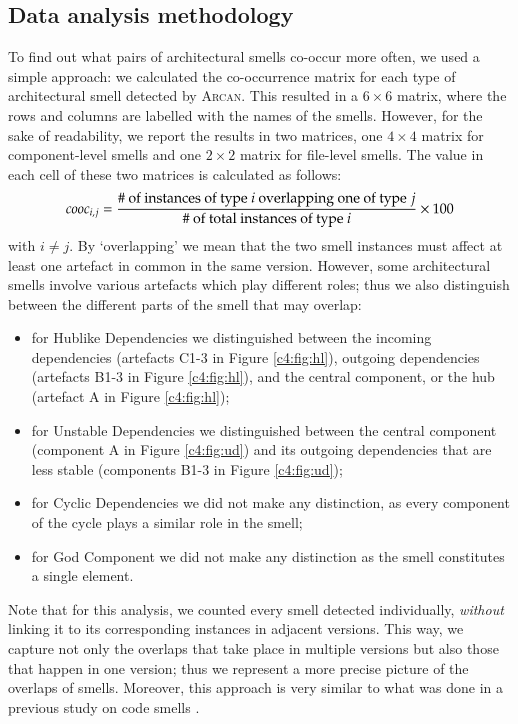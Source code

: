 \subsection{Data analysis methodology}\label{c4:sec:methodology-rq2}
To find out what pairs of architectural smells co-occur more often, we used a simple approach: we calculated the co-occurrence matrix for each type of architectural smell detected by \textsc{Arcan}. This resulted in a $6\times6$ matrix, where the rows and columns are labelled with the names of the smells. However, for the sake of readability, we report the results in two matrices, one $4\times4$ matrix for component-level smells and one $2\times2$ matrix for file-level smells. 
The value in each cell of these two matrices is calculated as follows: 
\begin{equation}
    cooc_{i,j} = \frac{\# \textnormal{ of instances of type } i \textnormal{ overlapping one of type } j}{\# \textnormal{ of total instances of type } i} \times 100
\end{equation}
with $i \neq j$.
By `overlapping' we mean that the two smell instances must affect at least one artefact in common in the same version.
However, some architectural smells involve various artefacts which play different roles; thus we also distinguish between the different parts of the smell that may overlap:
\begin{itemize}
    \item for Hublike Dependencies we distinguished between the incoming dependencies (artefacts C1-3 in Figure \ref{c4:fig:hl}), outgoing dependencies (artefacts B1-3 in Figure \ref{c4:fig:hl}), and the central component, or the hub (artefact A in Figure \ref{c4:fig:hl});
    \item for Unstable Dependencies we distinguished between the central component (component A in Figure \ref{c4:fig:ud}) and its outgoing dependencies that are less stable (components B1-3 in Figure \ref{c4:fig:ud});
    \item for Cyclic Dependencies we did not make any distinction, as every component of the cycle plays a similar role in the smell;
    \item for God Component we did not make any distinction as the smell constitutes a single element.
\end{itemize}

Note that for this analysis, we counted every smell detected individually, \emph{without} linking it to its corresponding instances in adjacent versions. This way, we capture not only the overlaps that take place in multiple versions but also those that happen in one version; thus we represent a more precise picture of the overlaps of smells. Moreover, this approach is very similar to what was done in a previous study on code smells \cite{Palomba2018}.

